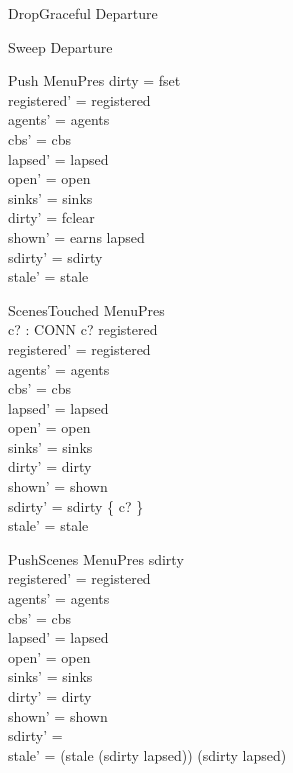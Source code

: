 \documentclass[a4paper,10pt,fleqn]{article}
\begin{document}
\begin{zed}
  DropGraceful  Departure
\end{zed}

\begin{zed}
  Sweep  Departure 
\end{zed}

\begin{schema}{Push}
  \Delta MenuPres
\where
  dirty = fset \\
  registered' = registered \\
  agents' = agents \\
  cbs' = cbs \\
  lapsed' = lapsed \\
  open' = open \\
  sinks' = sinks \\
  dirty' = fclear \\
  shown' = earns \setminus lapsed \\
  sdirty' = sdirty \\
  stale' = stale
\end{schema}

\begin{schema}{ScenesTouched}
  \Delta MenuPres \\
  c? : CONN
\where
  c? \in registered \\
  registered' = registered \\
  agents' = agents \\
  cbs' = cbs \\
  lapsed' = lapsed \\
  open' = open \\
  sinks' = sinks \\
  dirty' = dirty \\
  shown' = shown \\
  sdirty' = sdirty \cup \{ c? \} \\
  stale' = stale
\end{schema}

\begin{schema}{PushScenes}
  \Delta MenuPres
\where
  sdirty \neq \emptyset \\
  registered' = registered \\
  agents' = agents \\
  cbs' = cbs \\
  lapsed' = lapsed \\
  open' = open \\
  sinks' = sinks \\
  dirty' = dirty \\
  shown' = shown \\
  sdirty' = \emptyset \\
  stale' = (stale \setminus (sdirty \setminus lapsed)) \cup (sdirty \cap lapsed)
\end{schema}
\end{document}

